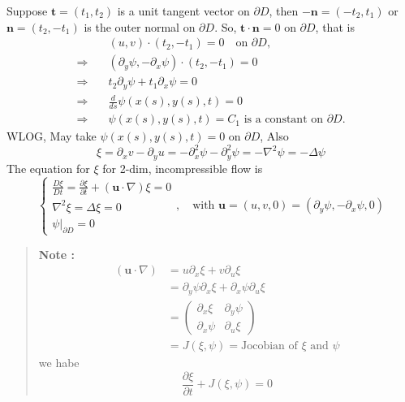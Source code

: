 Suppose $\textbf{t} = (t_1,t_2)$ is a unit tangent vector on $\partial D$, then $-\textbf{n} = (-t_2,t_1)$ or $\textbf{n}=(t_2,-t_1)$ is the outer normal  on $\partial D$. So, $\textbf{t}\cdot\textbf{n} = 0$ on $\partial D$, that is 
\begin{equation}
\begin{aligned}
& (u,v) \cdot (t_2, -t_1) = 0 \quad\text{on $\partial D$,}\\
\Rightarrow\quad
& (\partial_y \psi, - \partial_x \psi)\cdot (t_2, -t_1) = 0\\
\Rightarrow\quad
& t_2\partial_y \psi +  t_1\partial_x\psi=0\\
\Rightarrow\quad
& \frac{d}{ds}\psi(x(s),y(s),t) = 0\\
\Rightarrow\quad
& \psi(x(s),y(s),t)=C_1 \text{ is a constant on $\partial D$}.
\end{aligned}
\end{equation}
WLOG, May take $\psi(x(s),y(s),t)=0$ on $\partial D$, Also
\begin{equation}
\xi = \partial_x v - \partial_y u = -\partial^2_x\psi-\partial^2_y\psi
= -\nabla^2 \psi= -\Delta \psi
\end{equation}
The equation for $\xi$  for 2-dim, incompressible flow is 
\begin{equation}
\begin{cases}
\displaystyle \frac{D\xi}{Dt} = \frac{\partial \xi}{\partial t} + \left(\textbf{u}\cdot\nabla\right)\xi = 0\\
\displaystyle \nabla^2 \xi = \Delta \xi = 0\\
\displaystyle \psi\bigg|_{\partial D} = 0
\end{cases},\quad\text{with $\textbf{u}=(u,v,0)=(\partial_y\psi, -\partial_x\psi,0)$}
\end{equation}


\begin{quote}
	\textbf{Note :}
\begin{equation}
\begin{aligned}
\left(\textbf{u} \cdot \nabla\right)
&= u\partial_x \xi + v\partial_u \xi\\
&= \partial_y \psi \partial_x\xi + \partial_x \psi \partial_u \xi\\
&= \begin{pmatrix}\partial_x\xi & \partial_y \psi\\ \partial_x \psi & \partial_u \xi\end{pmatrix}\\
&= J(\xi,\psi) =\text{Jocobian of $\xi$ and $\psi$}
\end{aligned}
\end{equation}
we habe
\begin{equation}
\frac{\partial \xi}{\partial t} + J(\xi,\psi) = 0
\end{equation}

\end{quote}

